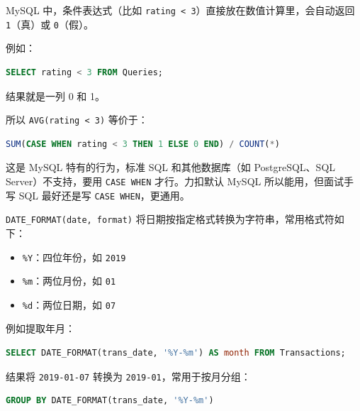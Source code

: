 \begin{homework}[1211 | 聚合函数 第5题]
\begin{note}
MySQL 中，条件表达式（比如 \texttt{rating < 3}）直接放在数值计算里，会自动返回 \texttt{1}（真）或 \texttt{0}（假）。

例如：
\begin{lstlisting}[language=SQL]
SELECT rating < 3 FROM Queries;
\end{lstlisting}
结果就是一列 0 和 1。

所以 \texttt{AVG(rating < 3)} 等价于：
\begin{lstlisting}[language=SQL]
SUM(CASE WHEN rating < 3 THEN 1 ELSE 0 END) / COUNT(*)
\end{lstlisting}

这是 MySQL 特有的行为，标准 SQL 和其他数据库（如 PostgreSQL、SQL Server）不支持，要用 \texttt{CASE WHEN} 才行。力扣默认 MySQL 所以能用，但面试手写 SQL 最好还是写 \texttt{CASE WHEN}，更通用。
\end{note}
\end{homework}

\begin{definition}
\texttt{DATE\_FORMAT(date, format)} 将日期按指定格式转换为字符串，常用格式符如下：
\begin{itemize}
    \item \texttt{\%Y}：四位年份，如 \texttt{2019}
    \item \texttt{\%m}：两位月份，如 \texttt{01}
    \item \texttt{\%d}：两位日期，如 \texttt{07}
\end{itemize}
例如提取年月：
\begin{lstlisting}[language=SQL]
SELECT DATE_FORMAT(trans_date, '%Y-%m') AS month FROM Transactions;
\end{lstlisting}
结果将 \texttt{2019-01-07} 转换为 \texttt{2019-01}，常用于按月分组：
\begin{lstlisting}[language=SQL, backgroundcolor=\color{white}, frame=single]
GROUP BY DATE_FORMAT(trans_date, '%Y-%m')
\end{lstlisting}
\end{definition}

